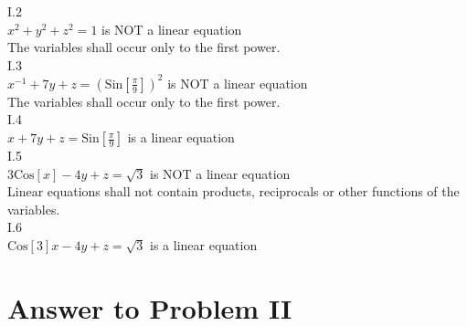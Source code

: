 \documentclass[11pt,a4paper]{article}
\begin{document}
I.2\\
\(x^2+y^2+z^2=1\) is NOT a linear equation\\
The variables shall occur only to the first power.\\

I.3\\
\(x^{-1}+7y+z=\)\(\left(\text{Sin}\left[\frac{\pi }{9}\right]\right)^2\) is NOT a linear equation\\
The variables shall occur only to the first power.\\

I.4\\
\(x+7y+z=\text{Sin}\left[\frac{\pi }{9}\right]\) is a linear equation\\

I.5\\
\(3\text{Cos}[x]-4y+z=\sqrt{3}\) is NOT a linear equation\\
Linear equations shall not contain products, reciprocals or other functions of the variables.\\

I.6\\
\(\text{Cos}[3]x-4y+z=\sqrt{3}\) is a linear equation

\clearpage
\section{Answer to Problem II}\label{sec:P02} %
\end{document}
